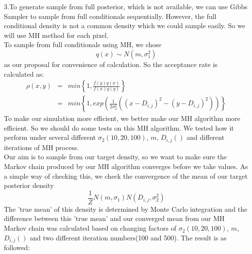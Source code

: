 \documentclass[11pt]{scrartcl}
\begin{document}
3.To generate sample from full posterior, which is not available, we can use Gibbs Sampler to sample from full conditionals sequentially. However, the full conditional density is not a common density which we could sample easily. So we will use MH method for each pixel.\\
To sample from full conditionals using MH, we chose 
$$q(x) \sim N(m,\sigma^2_1)$$
as our proposal for convenience of calculation. So the acceptance rate is calculated as:
$$
\begin{array}{lcl}
\rho(x, y) &=& min\left\{1,\frac{f(y)q(x)}{f(x)q(y)}\right\}\\
&=& min\left\{1,exp(\frac{1}{2\sigma^2_2}((x-D_{i,j})^2-(y-D_{i,j})^2))\right\}
\end{array}
$$
To make our simulation more efficient, we better make our MH algorithm more efficient. So we should do some tests on this MH algorithm. We tested how it perform under several different $\sigma_2(10,20,100)$, $m$, $D_{i,j}()$ and different iterations of MH process.\\
Our aim is to sample from our target density, so we want to make sure the Markov chain produced by our MH algorithm converges before we take values. As a simple way of checking this, we check the convergence of the mean of our target posterior density
$$\frac{1}{Z}N(m,\sigma_1)N(D_{i,j},\sigma^2_2)$$
The 'true mean' of this density is determined by Monte Carlo integration and the difference between this 'true mean' and our converged mean from our MH Markov chain was calculated based on changing factors of $\sigma_2(10,20,100)$, $m$, $D_{i,j}()$ and two different iteration numbers(100 and 500). The result is as followed:\\
\end{document}
